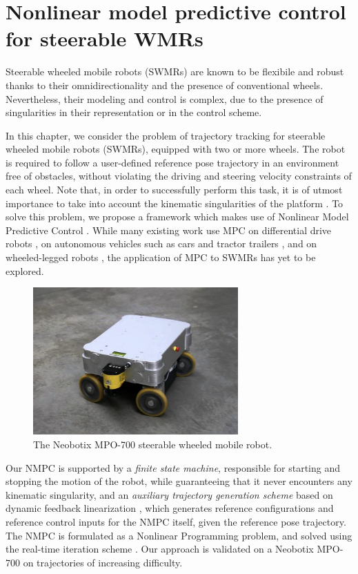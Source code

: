 \chapter{Nonlinear model predictive control for steerable WMRs}
\label{ch:nmpc-swmr}
Steerable wheeled mobile robots (SWMRs) are known to be flexibile and robust
thanks to their omnidirectionality and the presence of conventional wheels.
Nevertheless, their modeling and control is complex, due
to the presence of singularities in their representation or in the control
scheme.

In this chapter, we consider the problem of trajectory tracking for steerable
wheeled mobile robots (SWMRs), equipped with two or more wheels.
The robot is required to follow a user-defined reference pose trajectory in
an environment free of obstacles, without violating the driving and steering
velocity constraints of each wheel. Note that, in order to successfully perform
this task, it is of utmost importance to take into account the kinematic
singularities of the platform \cite{Sorour2019RAS}. To solve this
problem, we propose a framework which makes use of
Nonlinear Model Predictive Control \cite{Rawlings2017MPCBook}.
While many existing work use MPC on differential drive robots \cite{Tarantos2023Springer},
on autonomous vehicles such as cars \cite{Zanon2014Springer} and tractor trailers
\cite{Beglini2022TMECH}, and on wheeled-legged robots \cite{Bjelonic2021IROS},
the application of MPC to SWMRs has yet to be explored.

\begin{figure}
    \centering
    \includegraphics[width=0.7\textwidth]{figures/SWMR/mpo-700.jpg}
    \caption{The Neobotix MPO-700 steerable wheeled mobile robot.}
    \label{fig:mpo-700}
\end{figure}

Our NMPC is supported by a \textit{finite state machine}, responsible for
starting and stopping the motion of the robot, while guaranteeing that it never
encounters any kinematic singularity, and
an \textit{auxiliary trajectory generation scheme} based on dynamic
feedback linearization \cite{Oriolo2002WMRControlDFL}, which generates
reference configurations and reference control inputs for the NMPC
itself, given the reference pose trajectory. 
The NMPC is formulated as a Nonlinear Programming problem, and solved using the
real-time iteration scheme \cite{Gros2020Fromlineartononlinear}.
Our approach is validated on a
Neobotix MPO-700 on trajectories of increasing difficulty.

